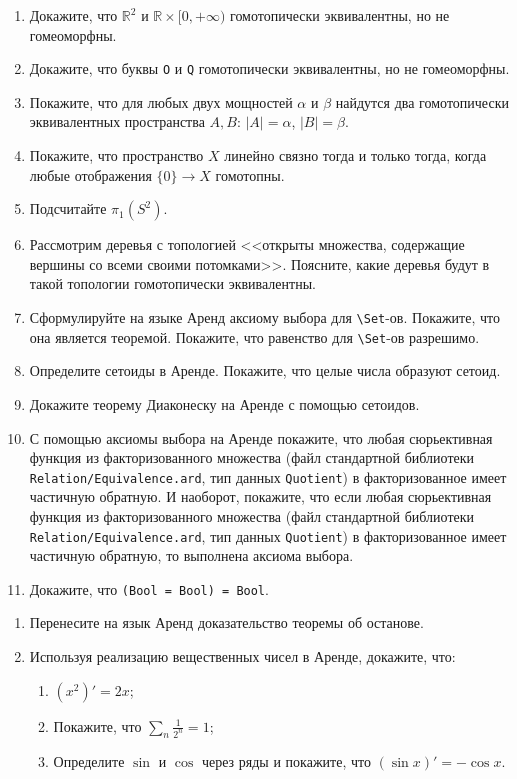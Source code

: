 \documentclass[10pt,a4paper,oneside]{article}
\begin{document}
\begin{enumerate}
\item Докажите, что $\mathbb{R}^2$ и $\mathbb{R}\times [0,+\infty)$ гомотопически эквивалентны, но не гомеоморфны.
\item Докажите, что буквы \verb!O! и \verb!Q! гомотопически эквивалентны, но не гомеоморфны.
\item Покажите, что для любых двух мощностей $\alpha$ и $\beta$ найдутся два гомотопически эквивалентных пространства $A, B$: $|A|=\alpha$,
$|B|=\beta$.
\item Покажите, что пространство $X$ линейно связно тогда и только тогда, когда любые отображения $\{0\} \rightarrow X$ гомотопны.
\item Подсчитайте $\pi_1(S^2)$.
\item Рассмотрим деревья с топологией <<открыты множества, содержащие вершины со всеми своими потомками>>. Поясните, какие деревья
будут в такой топологии гомотопически эквивалентны.
\item Сформулируйте на языке Аренд аксиому выбора для \verb!\Set!-ов. Покажите, что она является теоремой.
Покажите, что равенство для \verb!\Set!-ов разрешимо.
\item Определите сетоиды в Аренде. Покажите, что целые числа образуют сетоид.
\item Докажите теорему Диаконеску на Аренде с помощью сетоидов.
\item С помощью аксиомы выбора на Аренде покажите, что любая сюрьективная функция из факторизованного множества (файл стандартной
библиотеки \verb!Relation/Equivalence.ard!, тип данных \verb!Quotient!) в факторизованное имеет частичную обратную.
И наоборот, покажите, что если любая сюрьективная функция из факторизованного множества (файл стандартной
библиотеки\\ \verb!Relation/Equivalence.ard!, тип данных \verb!Quotient!) в факторизованное имеет частичную обратную, то выполнена аксиома выбора.
\item Докажите, что \verb!(Bool = Bool) = Bool!.
\end{enumerate}

\begin{enumerate}
\item Перенесите на язык Аренд доказательство теоремы об останове.
\item Используя реализацию вещественных чисел в Аренде, докажите, что:
\begin{enumerate}
\item $(x^2)' = 2x$;
\item Покажите, что $\sum_{n} \frac{1}{2^n} = 1$;
\item Определите $\sin$ и $\cos$ через ряды и покажите, что $(\sin x)' = -\cos x$.
\end{enumerate}
\end{enumerate}
\end{document}
